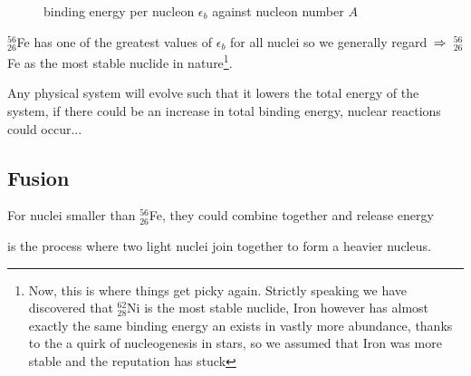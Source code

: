 \begin{figure*}[ht]
\centering
{}
  \label{binding-energy}
\caption{binding energy per nucleon $\epsilon_b$ against nucleon number $A$}
\end{figure*}

$^{56}_{26}$Fe has one of the greatest values of $\epsilon_b$ for all nuclei so we generally regard $\, \Rightarrow \,$ $^{56}_{26}$Fe as the most stable nuclide in nature\footnote{Now, this is where things get picky again. Strictly speaking we have discovered that $^{62}_{28}$Ni is the most stable nuclide, Iron however has almost exactly the same binding energy an exists in vastly more abundance, thanks to the a quirk of nucleogenesis in stars, so we assumed that Iron was more stable and the reputation has stuck}.

Any physical system will evolve such that it lowers the total energy of the system, if there could be an increase in total binding energy, nuclear reactions could occur...


\subsection{Fusion}

For nuclei smaller than $^{56}_{26}$Fe, they could combine together and release energy

\begin{ilight}
	 is the process where two light nuclei join together to form a heavier nucleus.
\end{ilight}

